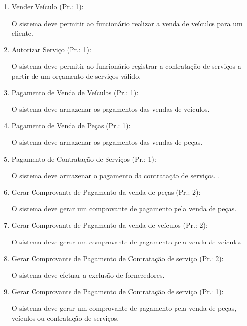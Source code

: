 \begin{enumerate}[
	label=RF\arabic{*}, 
	ref=(RF\arabic{*}),
	leftmargin=1.5em,
	itemindent=4.5em]
\item Vender Veículo (Pr.: 1):\par
O sistema deve permitir ao funcionário realizar a venda de veículos para um cliente.\par

\item Autorizar Serviço (Pr.: 1):\par
O sistema deve permitir ao funcionário registrar a contratação de serviços a partir de um orçamento de serviços válido.\par

\item Pagamento de Venda de Veículos (Pr.: 1):\par
O sistema deve armazenar os pagamentos das vendas de veículos. \par

\item Pagamento de Venda de Peças (Pr.: 1):\par
O sistema deve armazenar os pagamentos das vendas de peças.\par

\item Pagamento de Contratação de Serviços (Pr.: 1):\par
O sistema deve armazenar o pagamento da contratação de serviços. .\par

\item  Gerar Comprovante de Pagamento da venda de peças  (Pr.: 2):\par
O sistema deve gerar um comprovante de pagamento pela venda de peças.\par

\item Gerar Comprovante de Pagamento da venda de veículos  (Pr.: 2):\par
O sistema deve gerar um comprovante de pagamento pela venda de veículos.\par

\item  Gerar Comprovante de Pagamento de Contratação de serviço (Pr.: 2):\par
O sistema deve efetuar a exclusão de fornecedores.\par

\item Gerar Comprovante de Pagamento de Contratação de serviço (Pr.: 1):\par
O sistema deve gerar um comprovante de pagamento pela venda de peças, veículos ou contratação de serviços.\par


\end{enumerate}
